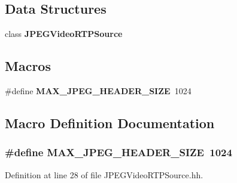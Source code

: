 \subsection*{Data Structures}
\begin{DoxyCompactItemize}
\item 
class {\bf J\+P\+E\+G\+Video\+R\+T\+P\+Source}
\end{DoxyCompactItemize}
\subsection*{Macros}
\begin{DoxyCompactItemize}
\item 
\#define {\bf M\+A\+X\+\_\+\+J\+P\+E\+G\+\_\+\+H\+E\+A\+D\+E\+R\+\_\+\+S\+I\+Z\+E}~1024
\end{DoxyCompactItemize}


\subsection{Macro Definition Documentation}
\subsubsection[{M\+A\+X\+\_\+\+J\+P\+E\+G\+\_\+\+H\+E\+A\+D\+E\+R\+\_\+\+S\+I\+Z\+E}]{\setlength{\rightskip}{0pt plus 5cm}\#define M\+A\+X\+\_\+\+J\+P\+E\+G\+\_\+\+H\+E\+A\+D\+E\+R\+\_\+\+S\+I\+Z\+E~1024}\label{JPEGVideoRTPSource_8hh_a9b279136983df6fb6f6c20c9fa24f807}


Definition at line 28 of file J\+P\+E\+G\+Video\+R\+T\+P\+Source.\+hh.


